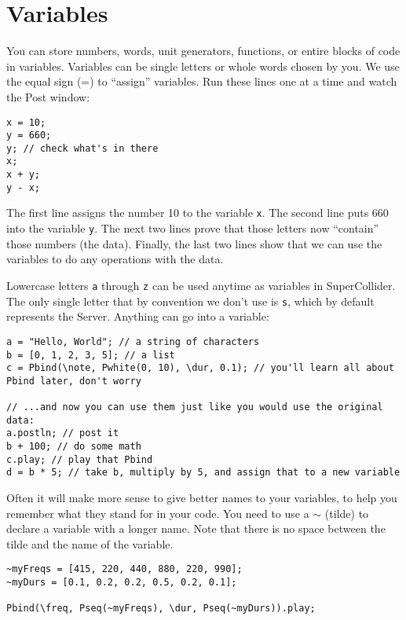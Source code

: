 \section{Variables}
\label{sec:variables}

You can store numbers, words, unit generators, functions, or entire blocks of code in variables. Variables can be single letters or whole words chosen by you. We use the equal sign (=) to ``assign'' variables. Run these lines one at a time and watch the Post window:

 
\begin{lstlisting}[style=SuperCollider-IDE, basicstyle=\scttfamily\footnotesize]
x = 10;
y = 660;
y; // check what's in there
x;
x + y;
y - x;
\end{lstlisting}
 

The first line assigns the number 10 to the variable \texttt{x}. The second line puts 660 into the variable \texttt{y}. The next two lines prove that those letters now ``contain'' those numbers (the data). Finally, the last two lines show that we can use the variables to do any operations with the data.

Lowercase letters \texttt{a} through \texttt{z} can be used anytime as variables in SuperCollider. The only single letter that by convention we don't use is \texttt{s}, which by default represents the Server. Anything can go into a variable:
 
\begin{lstlisting}[style=SuperCollider-IDE, basicstyle=\scttfamily\footnotesize]
a = "Hello, World"; // a string of characters
b = [0, 1, 2, 3, 5]; // a list
c = Pbind(\note, Pwhite(0, 10), \dur, 0.1); // you'll learn all about Pbind later, don't worry

// ...and now you can use them just like you would use the original data:
a.postln; // post it
b + 100; // do some math
c.play; // play that Pbind
d = b * 5; // take b, multiply by 5, and assign that to a new variable
\end{lstlisting}

Often it will make more sense to give better names to your variables, to help you remember what they stand for in your code. You need to use a $\sim$ (tilde) to declare a variable with a longer name. Note that there is no space between the tilde and the name of the variable.

\begin{lstlisting}[style=SuperCollider-IDE, basicstyle=\scttfamily\footnotesize]
~myFreqs = [415, 220, 440, 880, 220, 990];
~myDurs = [0.1, 0.2, 0.2, 0.5, 0.2, 0.1];

Pbind(\freq, Pseq(~myFreqs), \dur, Pseq(~myDurs)).play;
\end{lstlisting}
 

